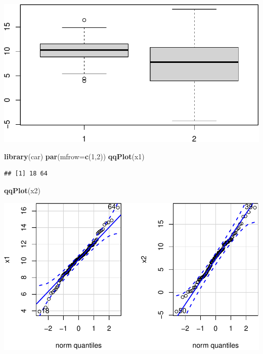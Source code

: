 \documentclass[
]{article}
\newenvironment{Shaded}{\begin{snugshade}}{\end{snugshade}}
\newcommand{\DataTypeTok}[1]{\textcolor[rgb]{0.13,0.29,0.53}{#1}}
\newcommand{\DecValTok}[1]{\textcolor[rgb]{0.00,0.00,0.81}{#1}}
\newcommand{\KeywordTok}[1]{\textcolor[rgb]{0.13,0.29,0.53}{\textbf{#1}}}
\newcommand{\NormalTok}[1]{#1}
\begin{document}
\includegraphics{taller_problemas_resueltos_extra_1_files/figure-latex/unnamed-chunk-8-1.pdf}

\begin{Shaded}
\begin{Highlighting}[]
\KeywordTok{library}\NormalTok{(car)}
\KeywordTok{par}\NormalTok{(}\DataTypeTok{mfrow=}\KeywordTok{c}\NormalTok{(}\DecValTok{1}\NormalTok{,}\DecValTok{2}\NormalTok{))}
\KeywordTok{qqPlot}\NormalTok{(x1)}
\end{Highlighting}
\end{Shaded}

\begin{verbatim}
## [1] 18 64
\end{verbatim}

\begin{Shaded}
\begin{Highlighting}[]
\KeywordTok{qqPlot}\NormalTok{(x2)}
\end{Highlighting}
\end{Shaded}

\includegraphics{taller_problemas_resueltos_extra_1_files/figure-latex/unnamed-chunk-8-2.pdf}
\end{document}
